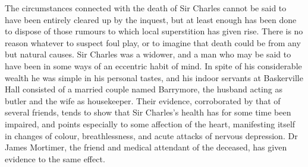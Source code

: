 \documentclass[paper=5.5in:8.5in,BCOR=7mm,twoside,DIV=calc,12pt,usegeometry,openany,chapterprefix,endperiod,headings=big]{scrbook} %
\begin{document}

\textsf{The circumstances connected with the death of Sir Charles cannot be said to have been entirely cleared up by the inquest, but at least enough has been done to dispose of those rumours to which local superstition has given rise. There is no reason whatever to suspect foul play, or to imagine that death could be from any but natural causes. Sir Charles was a widower, and a man who may be said to have been in some ways of an eccentric habit of mind. In spite of his considerable wealth he was simple in his personal tastes, and his indoor servants at Baskerville Hall consisted of a married couple named Barrymore, the husband acting as butler and the wife as housekeeper. Their evidence, corroborated by that of several friends, tends to show that Sir Charles's health has for some time been impaired, and points especially to some affection of the heart, manifesting itself in changes of colour, breathlessness, and acute attacks of nervous depression. Dr James Mortimer, the friend and medical attendant of the deceased, has given evidence to the same effect.}
\end{document}
